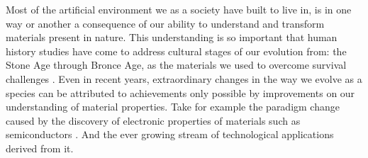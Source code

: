 Most of the artificial environment we as a society have built to live in, is in one way or another a consequence of our ability to understand and transform materials present in nature. This understanding is so important that human history studies have come to address cultural stages of our evolution from: the Stone Age through Bronce Age, as the materials we used to overcome survival challenges \cite{Joannopoulos2008}. Even in recent years, extraordinary changes in the way we evolve as a species can be attributed to achievements only possible by improvements on our understanding of material properties. Take for example the paradigm change caused by the discovery of electronic properties of materials such as semiconductors \cite{Obayya2011}. And the ever growing stream of technological applications derived from it.

